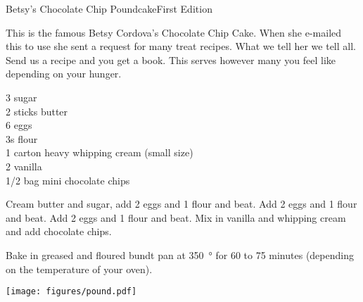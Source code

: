 \begin{entry}{Betsy's Chocolate Chip Poundcake}{First Edition}

\begin{open}
  This is the famous Betsy Cordova's Chocolate Chip Cake. When she e-mailed this
  to use she sent a request for many treat recipes.  What we tell her we tell
  all.  Send us a recipe and you get a book.  This serves however many you feel
  like depending on your hunger.
\end{open}
\begin{ingredients}
  \SI{3}{\cup} sugar \\
  2 sticks butter \\
  6 eggs \\
  \SI{3}{\cup}s flour  \\
  1 carton heavy whipping cream (small size) \\
  \SI{2}{\tblspoon}  vanilla \\
  \num{1/2} bag mini chocolate chips
\end{ingredients}
Cream butter and sugar, add 2 eggs and \SI{1}{\cup} flour and beat.  Add 2
eggs and \SI{1}{\cup} flour and beat. Add 2 eggs and \SI{1}{\cup} flour and
beat.  Mix in vanilla and whipping cream and add chocolate chips.

Bake in greased and floured bundt pan at \SI{350}{\degree} for 60 to 75
minutes (depending on the temperature of your oven).
\begin{center}
\texttt{[image: figures/pound.pdf]}
\end{center}
\end{entry}

